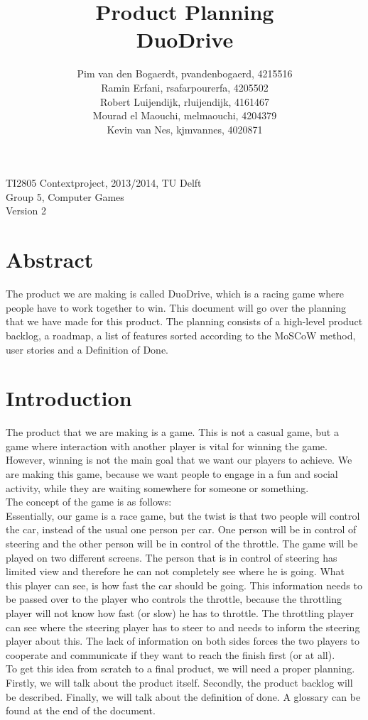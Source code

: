 \documentclass[11pt,twoside,a4paper]{article}
\title{
  Product Planning\\
  DuoDrive
}
\author{
	Pim van den Bogaerdt, pvandenbogaerd, 4215516\\
	Ramin Erfani, rsafarpourerfa, 4205502\\
	Robert Luijendijk, rluijendijk, 4161467\\
	Mourad el Maouchi, melmaouchi, 4204379\\
	Kevin van Nes, kjmvannes, 4020871
}
\begin{document}
\maketitle

\begin{center}
TI2805 Contextproject, 2013/2014, TU Delft\\
Group 5, Computer Games\\
Version 2
\end{center}

\newpage

\section*{Abstract}
The product we are making is called DuoDrive, which is a racing game where people have to work together to win. This document will go over the planning that we have made for this product. The planning consists of a high-level product backlog, a roadmap, a list of features sorted according to the MoSCoW method, user stories and a Definition of Done.

\newpage

\section{Introduction}
The product that we are making is a game. This is not a casual game, but a game where interaction with another player is vital for winning the game. However, winning is not the main goal that we want our players to achieve. We are making this game, because we want people to engage in a fun and social activity, while they are waiting somewhere for someone or something.\\
The concept of the game is as follows:\\
Essentially, our game is a race game, but the twist is that two people will control the car, instead of the usual one person per car. One person will be in control of steering and the other person will be in control of the throttle. The game will be played on two different screens. The person that is in control of steering has limited view and therefore he can not completely see where he is going. What this player can see, is how fast the car should be going. This information needs to be passed over to the player who controls the throttle, because the throttling player will not know how fast (or slow) he has to throttle. The throttling player can see where the steering player has to steer to and needs to inform the steering player about this. The lack of information on both sides forces the two players to cooperate and communicate if they want to reach the finish first (or at all).\\
To get this idea from scratch to a final product, we will need a proper planning. Firstly, we will talk about the product itself. Secondly, the product backlog will be described. Finally, we will talk about the definition of done. A glossary can be found at the end of the document.
\end{document}
